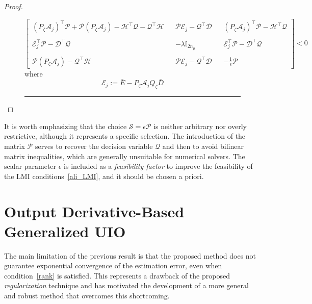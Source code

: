 \begin{proof}
\begin{figure}
\begin{equation}\label{ali_LMI}
\begin{bmatrix}
\left( P_{\zeta} \mathcal{A}_{j}\right)^{\top} \mathcal{P} + \mathcal{P} \left( P_{\zeta} \mathcal{A}_{j} \right)  - \mathcal{H}^{\top} \mathcal{Q}  - \mathcal{Q}^{\top}  \mathcal{H}
&&
\mathcal{P} \mathcal{E}_{j} - \mathcal{Q}^{\top}  \mathcal{D}  && \left( P_{\zeta} \mathcal{A}_{j}\right)^{\top} \mathcal{P} - \mathcal{H}^{\top} \mathcal{Q}
\\~\\
\mathcal{E}^{\top}_{j} \mathcal{P} - \mathcal{D}^{\top} \mathcal{Q} && 
- \lambda \mathbb{I}_{2n_{\mu}} && \mathcal{E}^{\top}_{j} \mathcal{P} - \mathcal{D}^{\top} \mathcal{Q}
\\~\\
\mathcal{P} \left( P_{\zeta} \mathcal{A}_{j} \right) - \mathcal{Q}^{\top}  \mathcal{H} && 
\mathcal{P} \mathcal{E}_{j} - \mathcal{Q}^{\top}  \mathcal{D} && - \displaystyle\frac{1}{\epsilon} \mathcal{P}
\end{bmatrix} 
< 0
\end{equation}
where 
$$
\mathcal{E}_{j} := \bar{E} - P_{\zeta} \mathcal{A}_{j} Q_{\zeta} \bar{D}
$$
\hrule
\end{figure}
%
\end{proof}


%


\begin{remark}
It is worth emphasizing that the choice $\mathcal{S} = \epsilon \mathcal{P}$ is neither arbitrary nor overly restrictive, although it represents a specific selection. The introduction of the matrix $\mathcal{P}$ serves to recover the decision variable $\mathcal{Q}$ and then to avoid bilinear matrix inequalities, which are generally unsuitable for numerical solvers. The scalar parameter $\epsilon$ is included as a {\it feasibility factor} to improve the feasibility of the LMI conditions~\eqref{ali_LMI}, and it should be chosen a priori.
\end{remark}





\section{Output Derivative-Based Generalized UIO}\label{output_derivative}
The main limitation of the previous result is that the proposed method does not guarantee exponential convergence of the estimation error, even when condition~\eqref{rank} is satisfied. This represents a drawback of the proposed {\it regularization} technique and has motivated the development of a more general and robust method that overcomes this shortcoming.

